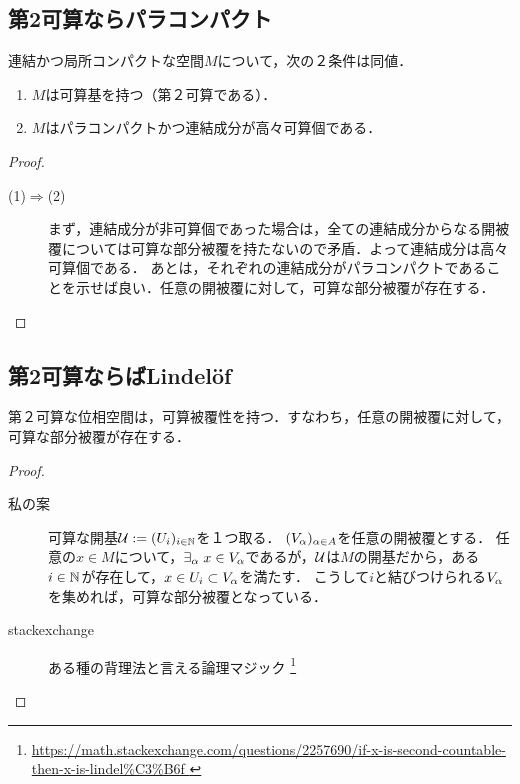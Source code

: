 \documentclass[uplatex,dvipdfmx]{jsreport}
\begin{document}
\subsection{第2可算ならパラコンパクト}


\begin{corollary}
    連結かつ局所コンパクトな空間$M$について，次の２条件は同値．
    \begin{enumerate}
        \item $M$は可算基を持つ（第２可算である）．
        \item $M$はパラコンパクトかつ連結成分が高々可算個である．
    \end{enumerate}
\end{corollary}
\begin{proof}\mbox{}
    \begin{description}
        \item[(1)$\Rightarrow$(2)] まず，連結成分が非可算個であった場合は，全ての連結成分からなる開被覆については可算な部分被覆を持たないので矛盾．よって連結成分は高々可算個である．
        あとは，それぞれの連結成分がパラコンパクトであることを示せば良い．任意の開被覆に対して，可算な部分被覆が存在する．
    \end{description}
\end{proof}

\subsection{第2可算ならばLindelöf}

\begin{lemma}
    第２可算な位相空間は，可算被覆性を持つ．すなわち，任意の開被覆に対して，可算な部分被覆が存在する．
\end{lemma}
\begin{proof}\mbox{}
    \begin{description}
        \item[私の案] 可算な開基$\mathcal{U}:=(U_i)_{i\in\mathbb{N}}$を１つ取る．
        $(V_\alpha)_{\alpha\in A}$を任意の開被覆とする．
        任意の$x\in M$について，$\exists_{\alpha}\;x\in V_\alpha$であるが，$\mathcal{U}$は$M$の開基だから，ある$i\in\mathbb{N}$が存在して，$x\in U_i\subset V_\alpha$を満たす．
        こうして$i$と結びつけられる$V_\alpha$を集めれば，可算な部分被覆となっている． 
        \item[stackexchange] ある種の背理法と言える論理マジック
    \footnote{\url{
        https://math.stackexchange.com/questions/2257690/if-x-is-second-countable-then-x-is-lindel%
    }}
    \end{description}
\end{proof}
\end{document}
